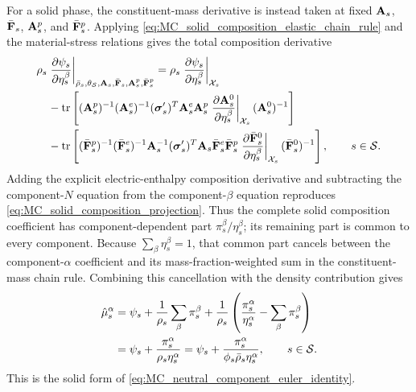 For a solid phase, the constituent-mass derivative is instead taken at fixed
\(\mathbf{A}_s\), \(\bar{\mathbf{F}}_s\), \(\mathbf{A}_s^p\), and
\(\bar{\mathbf{F}}_s^p\).  Applying
\eqref{eq:MC_solid_composition_elastic_chain_rule} and the material-stress
relations gives the total composition derivative
%
\begin{align}
	&\rho_s
	\left.
	\frac{\partial \psi_s}{\partial \eta_s^\beta}
	\right\vert_{
		\bar\rho_s,\theta_{\mathcal{S}},
		\mathbf{A}_s,\bar{\mathbf{F}}_s,
		\mathbf{A}_s^p,\bar{\mathbf{F}}_s^p
	}
	=
	\rho_s
	\left.
	\frac{\partial \psi_s}{\partial \eta_s^\beta}
	\right\vert_{\mathcal{X}_s}
	\notag \\
	&\quad
	-
	\operatorname{tr}\left[
		(\mathbf{A}_s^p)^{-1}
		(\mathbf{A}_s^e)^{-1}
		(\boldsymbol{\sigma}_s')^T
		\mathbf{A}_s^e\mathbf{A}_s^p
		\left.
		\frac{\partial \mathbf{A}_s^0}{\partial \eta_s^\beta}
		\right\vert_{\mathcal{X}_s}
		(\mathbf{A}_s^0)^{-1}
	\right]
	\notag \\
	&\quad
	-
	\operatorname{tr}\left[
		(\bar{\mathbf{F}}_s^p)^{-1}
		(\bar{\mathbf{F}}_s^e)^{-1}
		\mathbf{A}_s^{-1}
		(\boldsymbol{\sigma}_s')^T
		\mathbf{A}_s
		\bar{\mathbf{F}}_s^e
		\bar{\mathbf{F}}_s^p
		\left.
		\frac{\partial \bar{\mathbf{F}}_s^0}{\partial \eta_s^\beta}
		\right\vert_{\mathcal{X}_s}
		(\bar{\mathbf{F}}_s^0)^{-1}
	\right],
	\qquad
	s\in\mathcal{S} .
	\label{eq:appendix_solid_total_composition_derivative}
\end{align}
%
Adding the explicit electric-enthalpy composition derivative and subtracting
the component-\(N\) equation from the component-\(\beta\) equation reproduces
\eqref{eq:MC_solid_composition_projection}.  Thus the complete solid
composition coefficient has component-dependent part
\(\pi_s^\beta/\eta_s^\beta\); its remaining part is common to every component.
Because \(\sum_\beta\eta_s^\beta=1\), that common part cancels between the
component-\(\alpha\) coefficient and its mass-fraction-weighted sum in the
constituent-mass chain rule.  Combining this cancellation with the density
contribution gives
%
\begin{align}
	\hat\mu_s^\alpha
	={}&
	\psi_s
	+
	\frac{1}{\rho_s}
	\sum_\beta\pi_s^\beta
	+
	\frac{1}{\rho_s}
	\left(
		\frac{\pi_s^\alpha}{\eta_s^\alpha}
		-
		\sum_\beta\pi_s^\beta
	\right)
	\notag\\
	={}&
	\psi_s
	+
	\frac{\pi_s^\alpha}
	{\rho_s\eta_s^\alpha}
	=
	\psi_s
	+
	\frac{\pi_s^\alpha}
	{\phi_s\bar\rho_s\eta_s^\alpha},
	\qquad
	s\in\mathcal{S} .
	\label{eq:appendix_solid_weighted_composition_cancellation}
\end{align}
%
This is the solid form of
\eqref{eq:MC_neutral_component_euler_identity}.
